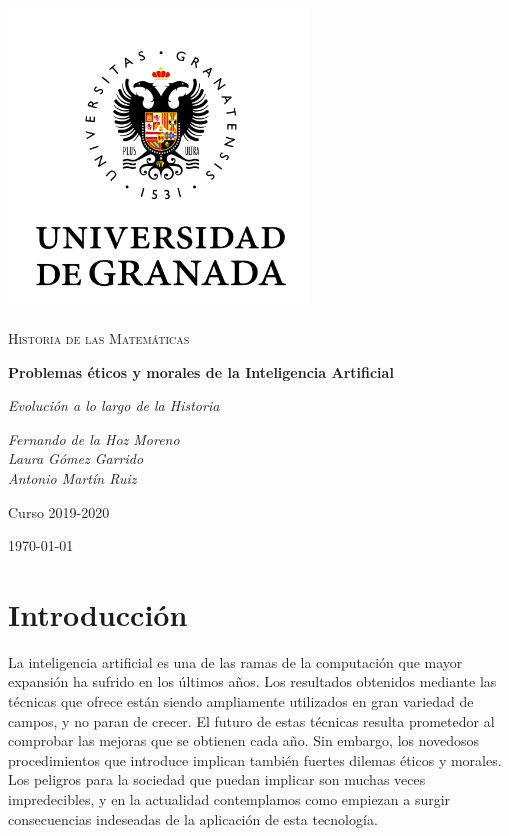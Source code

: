 \documentclass[12pt,a4paper]{article}
\begin{document}
\pgfplotsset{compat=1.15}
\begin{titlepage}
  \centering
  \includegraphics[width=0.6\textwidth]{ugr.png}\par\vspace{1cm}
  {\scshape\large Historia de las Matemáticas \par} \vspace{1cm}
  {\huge\bfseries Problemas éticos y morales de la Inteligencia Artificial \par}
  \vspace{0.4cm}
  {\large\itshape Evolución a lo largo de la Historia\\}
  \vspace{0.6cm}
  {\large\itshape  Fernando de la Hoz Moreno \\ Laura Gómez Garrido \\ Antonio Martín Ruiz  \par} \vspace{1.00cm}
  Curso 2019-2020 \\
  \vfill

  {\large \today\par}
\end{titlepage}

\tableofcontents
\newpage

\setlength{\parskip}{10pt}

\section{Introducción}

La inteligencia artificial es una de las ramas de la computación que mayor expansión ha sufrido en los últimos años. Los resultados obtenidos mediante las técnicas que ofrece están siendo ampliamente utilizados en gran variedad de campos, y no paran de crecer. El futuro de estas técnicas resulta prometedor al comprobar las mejoras que se obtienen cada año. Sin embargo, los novedosos procedimientos que introduce implican también fuertes dilemas éticos y morales. Los peligros para la sociedad que puedan implicar son muchas veces impredecibles, y en la actualidad contemplamos como empiezan a surgir consecuencias indeseadas de la aplicación de esta tecnología.
\end{document}
